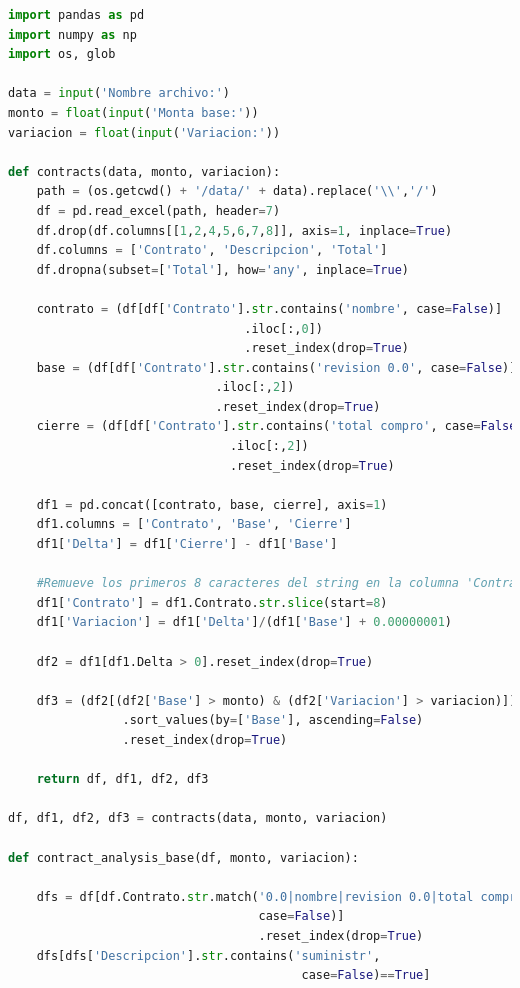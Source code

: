\begin{lstlisting}[language=Python]
import pandas as pd
import numpy as np
import os, glob

data = input('Nombre archivo:')
monto = float(input('Monta base:'))
variacion = float(input('Variacion:'))

def contracts(data, monto, variacion):
    path = (os.getcwd() + '/data/' + data).replace('\\','/')
    df = pd.read_excel(path, header=7)
    df.drop(df.columns[[1,2,4,5,6,7,8]], axis=1, inplace=True)
    df.columns = ['Contrato', 'Descripcion', 'Total']
    df.dropna(subset=['Total'], how='any', inplace=True)

    contrato = (df[df['Contrato'].str.contains('nombre', case=False)]
                                 .iloc[:,0])
                                 .reset_index(drop=True)
    base = (df[df['Contrato'].str.contains('revision 0.0', case=False)]
                             .iloc[:,2])
                             .reset_index(drop=True)
    cierre = (df[df['Contrato'].str.contains('total compro', case=False)]
                               .iloc[:,2])
                               .reset_index(drop=True)

    df1 = pd.concat([contrato, base, cierre], axis=1)
    df1.columns = ['Contrato', 'Base', 'Cierre']
    df1['Delta'] = df1['Cierre'] - df1['Base']

    #Remueve los primeros 8 caracteres del string en la columna 'Contratos'
    df1['Contrato'] = df1.Contrato.str.slice(start=8) 
    df1['Variacion'] = df1['Delta']/(df1['Base'] + 0.00000001)

    df2 = df1[df1.Delta > 0].reset_index(drop=True)
    
    df3 = (df2[(df2['Base'] > monto) & (df2['Variacion'] > variacion)])
                .sort_values(by=['Base'], ascending=False)
                .reset_index(drop=True)

    return df, df1, df2, df3

df, df1, df2, df3 = contracts(data, monto, variacion)

def contract_analysis_base(df, monto, variacion):

    dfs = df[df.Contrato.str.match('0.0|nombre|revision 0.0|total compro', 
                                   case=False)]
                                   .reset_index(drop=True)
    dfs[dfs['Descripcion'].str.contains('suministr', 
                                         case=False)==True]


\end{lstlisting}
